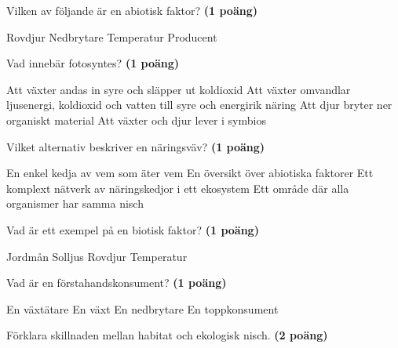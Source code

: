 \documentclass[a4paper,12pt]{exam}
\begin{document}
\begin{questions}
    
\question Vilken av följande är en abiotisk faktor? \textbf{(1 poäng)}
\vspace{5mm}
\begin{checkboxes}
    \choice Rovdjur
    \choice Nedbrytare
    \CorrectChoice Temperatur
    \choice Producent
\end{checkboxes}
\vspace{10mm}

\question Vad innebär fotosyntes? \textbf{(1 poäng)}
\vspace{5mm}
\begin{checkboxes}
    \choice Att växter andas in syre och släpper ut koldioxid
    \CorrectChoice Att växter omvandlar ljusenergi, koldioxid och vatten till syre och energirik näring
    \choice Att djur bryter ner organiskt material
    \choice Att växter och djur lever i symbios
\end{checkboxes}
\vspace{10mm}

\question Vilket alternativ beskriver en näringsväv? \textbf{(1 poäng)}
\vspace{5mm}
\begin{checkboxes}
    \choice En enkel kedja av vem som äter vem
    \choice En översikt över abiotiska faktorer
    \CorrectChoice Ett komplext nätverk av näringskedjor i ett ekosystem
    \choice Ett område där alla organismer har samma nisch
\end{checkboxes}
\vspace{10mm}
\break

\question Vad är ett exempel på en biotisk faktor? \textbf{(1 poäng)}
\vspace{5mm}
\begin{checkboxes}
    \choice Jordmån
    \choice Solljus
    \CorrectChoice Rovdjur
    \choice Temperatur
\end{checkboxes}
\vspace{10mm}

\question Vad är en förstahandskonsument? \textbf{(1 poäng)}
\vspace{5mm}
\begin{checkboxes}
    \CorrectChoice En växtätare
    \choice En växt
    \choice En nedbrytare
    \choice En toppkonsument
\end{checkboxes}
\vspace{10mm}
\question Förklara skillnaden mellan habitat och ekologisk nisch. \textbf{(2 poäng)}
\vspace{30mm}


\end{questions}
\end{document}
